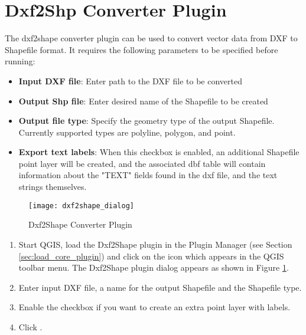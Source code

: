 
\section{Dxf2Shp Converter Plugin}\label{dxf2shape}

\updatedisclaimer

The dxf2shape converter plugin can be used to convert vector data from DXF to Shapefile 
format. It requires the following parameters to be specified before running:

\begin{itemize}
\item \textbf{Input DXF file}: Enter path to the DXF file to be converted
\item \textbf{Output Shp file}: Enter desired name of the Shapefile to be created
\item \textbf{Output file type}: Specify the geometry type of the output Shapefile. 
Currently supported types are polyline, polygon, and point.
\item \textbf{Export text labels}: When this checkbox is enabled, an additional Shapefile point layer will be created, and the associated dbf table will contain information about the "TEXT" fields found in the dxf file, and the text strings themselves.
\end{itemize}

\begin{figure}[ht]
   \centering
   \texttt{[image: dxf2shape\_dialog]}   
   \caption{Dxf2Shape Converter Plugin \nixcaption}\label{fig:dxf2shape_dialog}
\end{figure}


\begin{enumerate}
  \item Start QGIS, load the Dxf2Shape plugin in the Plugin Manager (see Section 
  \ref{sec:load_core_plugin}) and click on the  
  icon which appears in the QGIS toolbar menu. The Dxf2Shape plugin dialog appears as shown in Figure \ref{fig:dxf2shape_dialog}.
  \item Enter input DXF file, a name for the output Shapefile and the Shapefile type.
  \item Enable the  checkbox if you want to create an extra point layer with labels.
  \item Click . 
\end{enumerate}

\FloatBarrier
